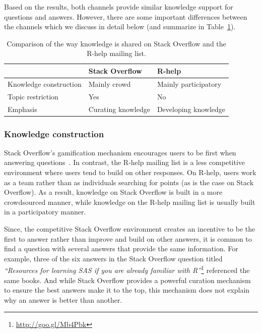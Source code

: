 \documentclass[smallextended]{svjour3}       %
\newcommand{\SO}{Stack Overflow\xspace}
\newcommand{\RH}{R-help\xspace}
\begin{document}
    Based on the results, both channels provide similar knowledge support for questions and answers.
    However, there are some important differences between the channels which we discuss in detail below (and summarize in Table~\ref{table:constrat}).

    \begin{table}[!htb]
      \centering
      \caption{Comparison of the way knowledge is shared on \SO and the \RH mailing list.}
      \label{table:constrat}
      \begin{small}
        \setlength{\tabcolsep}{5pt}
        \begin{tabular}{@{}lll@{}}
          \toprule
          \textbf{}      & \textbf{\SO} & \textbf{\RH}\\
          \midrule
          Knowledge construction & Mainly crowd             & Mainly participatory \\
          Topic restriction      & Yes & No \\
          Emphasis & Curating knowledge & Developing knowledge \\ 
          \bottomrule
        \end{tabular}
      \end{small}
\vspace{-4mm}
    \end{table}

\subsubsection{Knowledge construction}

\SO's gamification mechanism encourages users to be first when answering questions~\cite{Singer2013}. In contrast, the \RH mailing list is a less competitive
environment where users tend to build on other responses. On \RH, users work as a team rather than as individuals searching for points (as is the case on \SO).
As a result, knowledge on \SO is built in a more crowdsourced manner, while knowledge on the \RH mailing list is usually built in a participatory manner.

Since, the competitive \SO environment creates an incentive to be the first to answer rather than improve and build on other answers, it is common to find a question with several answers that provide the same information. For example, three of the six answers in the \SO question titled \textit{``Resources for learning SAS if you are already familiar with R''}\footnote{\url{http://goo.gl/Mb4Pbk}} referenced the same books.
And while \SO provides a powerful curation mechanism to ensure the best answers make it to the top, this mechanism does not explain why an answer is better than another.
\end{document}

